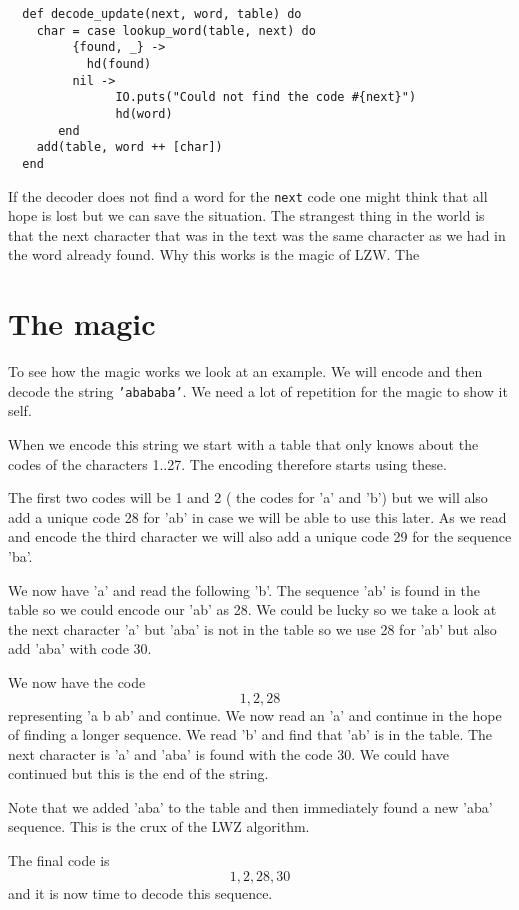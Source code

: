 \documentclass[a4paper,11pt]{article}
\begin{document}
\begin{verbatim}
  def decode_update(next, word, table) do
    char = case lookup_word(table, next) do
	     {found, _} ->
	       hd(found)
	     nil ->
               IO.puts("Could not find the code #{next}")
               hd(word)
	   end
    add(table, word ++ [char])
  end
\end{verbatim}

If the decoder does not find a word for the {\tt next} code one might
think that all hope is lost but we can save the situation. The
strangest thing in the world is that the next character that was in
the text was the same character as we had in the word already found.
Why this works is the magic of LZW. The

\section{The magic}

To see how the magic works we look at an example. We will encode and
then decode the string {\tt 'abababa'}. We need a lot of
repetition for the magic to show it self.

When we encode this string we start with a table that only knows about
the codes of the characters 1..27. The encoding therefore starts
using these.

The first two codes will be 1 and 2 ( the codes for 'a' and 'b') but we
will also add a unique code 28 for 'ab' in case we will be able to use
this later. As we read and encode the third character we will also add
a unique code 29 for the sequence 'ba'.

We now have 'a' and read the following 'b'. The sequence 'ab' is found
in the table so we could encode our 'ab' as 28. We could be lucky so we take
a look at the next character 'a' but 'aba' is not in the table so we
use 28 for 'ab' but also add 'aba' with code 30.

We now have the code {\tt \[1, 2, 28\]} representing 'a b ab' and
continue. We now read an 'a' and continue in the hope of finding a
longer sequence. We read 'b' and find that 'ab' is in the table. The
next character is 'a' and 'aba' is found with the code 30. We could
have continued but this is the end of the string.

Note that we added 'aba' to the table and then immediately found a new
'aba' sequence. This is the crux of the LWZ algorithm. 

The final code is {\tt \[1, 2, 28, 30\]} and it is now time to decode
this sequence.
\end{document}
